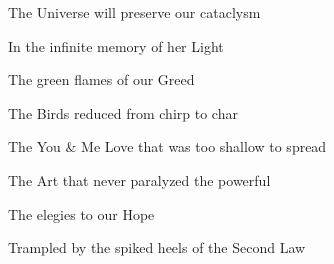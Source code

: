 \documentclass{article}
\begin{document}
\newline

The Universe will preserve our cataclysm

In the infinite memory of her Light

The green flames of our Greed

The Birds reduced from chirp to char

The You \& Me Love that was too shallow to spread

The Art that never paralyzed the powerful

The elegies to our Hope

Trampled by the spiked heels of the Second Law
\end{document}
